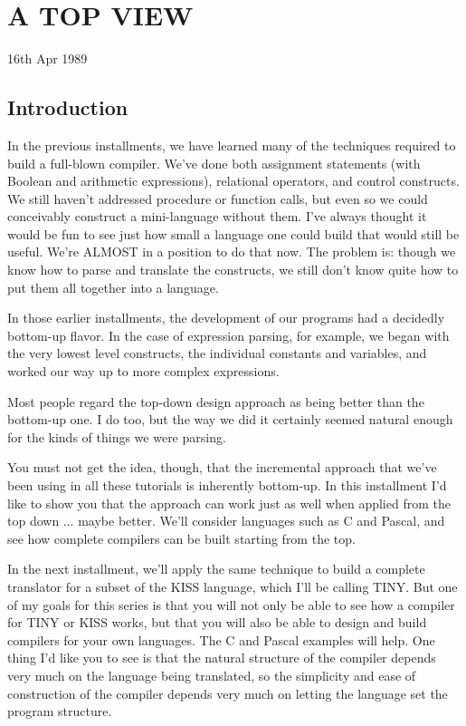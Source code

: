 
\chapter{A TOP VIEW}

16th Apr 1989

\section{Introduction}

In  the  previous  installments, we  have  learned  many of  the techniques required to  build  a full-blown compiler. We've done both  assignment   statements   (with   Boolean   and  arithmetic expressions), relational operators, and control constructs. We still haven't  addressed procedure or function calls, but even so we  could  conceivably construct a  mini-language  without  them. I've  always  thought  it would be fun to see just  how  small  a language  one  could  build  that  would still be useful. We're ALMOST in a position to do that now. The  problem  is: though we know  how  to  parse and translate the constructs, we still don't know quite how to put them all together into a language.

In those earlier installments, the  development  of  our programs had  a decidedly bottom-up flavor. In  the  case  of  expression parsing, for  example, we  began  with  the  very lowest  level constructs, the individual constants  and  variables, and worked our way up to more complex expressions.

Most people regard  the  top-down design approach as being better than  the  bottom-up  one. I do too, but  the  way  we  did  it certainly seemed natural enough for the kinds of  things  we were parsing.

You must not get  the  idea, though, that the incremental approach that  we've  been  using  in  all these tutorials  is  inherently bottom-up. In  this  installment  I'd  like to show you that the approach can work just as well when applied from the top down ... maybe better. We'll consider languages such as C and Pascal, and see how complete compilers can be built starting from the top.

In the next installment, we'll  apply the same technique to build a  complete  translator  for a subset of the KISS language, which I'll be  calling  TINY. But one of my goals for this series is that you will  not only be able to see how a compiler for TINY or KISS  works, but  that you will also be able to design and build compilers for your own languages. The C and Pascal examples will help. One  thing I'd like you  to  see  is  that  the  natural structure of the compiler depends very much on the language being translated, so the simplicity and  ease  of  construction  of the compiler  depends  very  much  on  letting the language  set  the program structure.


